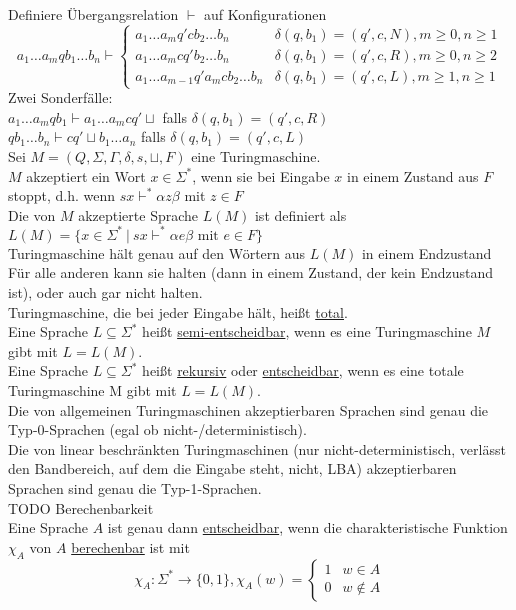 \documentclass[a4paper]{article}
\newcommand{\ul}{\underline}
\let\blank\sqcup
\begin{document}
Definiere Übergangsrelation $\vdash$ auf Konfigurationen
$$a_1\dots a_mqb_1\dots b_n\vdash\begin{cases}
a_1\dots a_mq'cb_2\dots b_n & \delta(q,b_1)=(q',c,N),m\geq 0,n\geq 1\\
a_1\dots a_mcq'b_2\dots b_n & \delta(q,b_1)=(q',c,R),m\geq 0,n\geq 2\\
a_1\dots a_{m-1}q'a_mcb_2\dots b_n & \delta(q,b_1)=(q',c,L),m\geq 1,n\geq 1
\end{cases}$$
Zwei Sonderfälle:\\
$a_1\dots a_mqb_1\vdash a_1\dots a_mcq'\blank$ falls $\delta(q,b_1)=(q',c,R)$\\
$qb_1\dots b_n\vdash cq'\blank b_1\dots a_n$ falls $\delta(q,b_1)=(q',c,L)$\\
Sei $M=(Q,\Sigma,\Gamma,\delta,s,\blank,F)$ eine Turingmaschine.\\
$M$ akzeptiert ein Wort $x\in\Sigma^*$, wenn sie bei Eingabe $x$ in einem Zustand aus $F$ stoppt, d.h. wenn $sx\vdash^*\alpha z\beta$ mit $z\in F$\\
Die von $M$ akzeptierte Sprache $L(M)$ ist definiert als $L(M)=\{x\in\Sigma^*\ \vert\ sx\vdash^*\alpha e\beta\text{ mit }e\in F\}$\\
Turingmaschine hält genau auf den Wörtern aus $L(M)$ in einem Endzustand\\
Für alle anderen kann sie halten (dann in einem Zustand, der kein Endzustand ist), oder auch gar nicht halten.\\
Turingmaschine, die bei jeder Eingabe hält, heißt \ul{total}.\\
Eine Sprache $L\subseteq\Sigma^*$ heißt \ul{semi-entscheidbar}, wenn es eine Turingmaschine $M$ gibt mit $L=L(M)$.\\
Eine Sprache $L\subseteq\Sigma^*$ heißt \ul{rekursiv} oder \ul{entscheidbar}, wenn es eine totale Turingmaschine M gibt mit $L=L(M)$.\\
Die von allgemeinen Turingmaschinen akzeptierbaren Sprachen sind genau die Typ-0-Sprachen (egal ob nicht-/deterministisch).\\
Die von linear beschränkten Turingmaschinen (nur nicht-deterministisch, verlässt den Bandbereich, auf dem die Eingabe steht, nicht, LBA) akzeptierbaren Sprachen sind genau die Typ-1-Sprachen.\\
TODO Berechenbarkeit\\
Eine Sprache $A$ ist genau dann \ul{entscheidbar}, wenn die charakteristische Funktion $\chi_A$ von $A$ \ul{berechenbar} ist mit $$\chi_A:\Sigma^*\rightarrow\{0,1\}, \chi_A(w)=\begin{cases}
1 & w\in A\\
0 & w\notin A
\end{cases}$$
\end{document}
